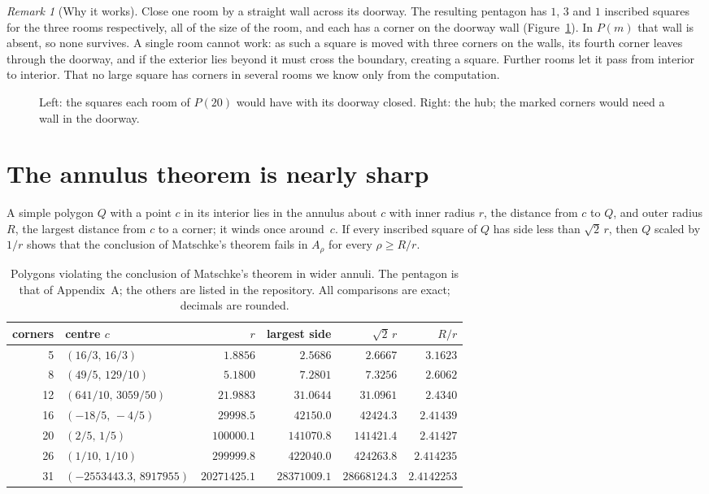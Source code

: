 \documentclass[11pt,a4paper]{article}
\theoremstyle{remark}\newtheorem{remark}[theorem]{Remark}
\begin{document}
\begin{remark}[Why it works]
Close one room by a straight wall across its doorway. The resulting pentagon has
$1$, $3$ and $1$ inscribed squares for the three rooms respectively, all of the
size of the room, and each has a corner on the doorway wall
(Figure~\ref{fig:doorways}). In $P(m)$ that wall is absent, so none survives. A
single room cannot work: as such a square is moved with three corners on the
walls, its fourth corner leaves through the doorway, and if the exterior lies
beyond it must cross the boundary, creating a square. Further rooms let it pass
from interior to interior. That no large square has corners in several rooms we
know only from the computation.
\end{remark}

\begin{figure}[H]\centering
\caption{Left: the squares each room of $P(20)$ would have with its doorway
closed. Right: the hub; the marked corners would need a wall in the doorway.}\label{fig:doorways}
\end{figure}


\section{The annulus theorem is nearly sharp}

A simple polygon $Q$ with a point $c$ in its interior lies in the annulus about
$c$ with inner radius $r$, the distance from $c$ to $Q$, and outer radius $R$, the
largest distance from $c$ to a corner; it winds once around~$c$. If every
inscribed square of $Q$ has side less than $\sqrt2\,r$, then $Q$ scaled by $1/r$
shows that the conclusion of Matschke's theorem fails in $A_\rho$ for every
$\rho\ge R/r$.

\begin{table}[H]\centering\small
\begin{tabular}{rlrrrr}\toprule
corners&centre $c$&$r$&largest side&$\sqrt2\,r$&$R/r$\\\midrule
5&$(16/3,\,16/3)$&$1.8856$&$2.5686$&$2.6667$&$3.1623$\\
8&$(49/5,\,129/10)$&$5.1800$&$7.2801$&$7.3256$&$2.6062$\\
12&$(641/10,\,3059/50)$&$21.9883$&$31.0644$&$31.0961$&$2.4340$\\
16&$(-18/5,\,-4/5)$&$29998.5$&$42150.0$&$42424.3$&$2.41439$\\
20&$(2/5,\,1/5)$&$100000.1$&$141070.8$&$141421.4$&$2.41427$\\
26&$(1/10,\,1/10)$&$299999.8$&$422040.0$&$424263.8$&$2.414235$\\
31&$(-2553443.3,\,8917955)$&$20271425.1$&$28371009.1$&$28668124.3$&$2.4142253$\\\bottomrule
\end{tabular}
\caption{Polygons violating the conclusion of Matschke's theorem in wider annuli.
The pentagon is that of Appendix~A; the others are listed in
the repository. All comparisons are exact; decimals are rounded.}\label{tab:ring}
\end{table}
\end{document}
